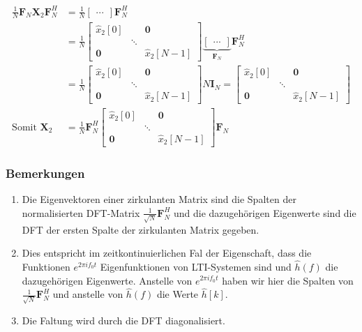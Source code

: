 \documentclass[11pt]{article}
\begin{document}
\begin{align*}
    \frac{1}{N}\mathbf{F}_N \mathbf{X}_2 \mathbf{F}_N^H &= \frac{1}{N} \begin{bmatrix}
        ...
    \end{bmatrix} \mathbf{F}_N^H \\
    &= \frac{1}{N} \begin{bmatrix}
        \hat{x}_2[0] & & \mathbf{0} \\
        & \ddots & \\
        \mathbf{0} & & \hat{x}_2[N-1]
    \end{bmatrix} \underbrace{\begin{bmatrix}
        ...
    \end{bmatrix}}_{\mathbf{F}_N} \mathbf{F}_N^H \\
    &= \frac{1}{N} \begin{bmatrix}
        \hat{x}_2[0] & & \mathbf{0} \\
        & \ddots & \\
        \mathbf{0} & & \hat{x}_2[N-1]
    \end{bmatrix} N \mathbf{I}_N = \begin{bmatrix}
        \hat{x}_2[0] & & \mathbf{0} \\
        & \ddots & \\
        \mathbf{0} & & \hat{x}_2[N-1]
    \end{bmatrix} \\
    \text{Somit } \mathbf{X}_2 &= \frac{1}{N} \mathbf{F}_N^H  \begin{bmatrix}
        \hat{x}_2[0] & & \mathbf{0} \\
        & \ddots & \\
        \mathbf{0} & & \hat{x}_2[N-1]
    \end{bmatrix}   \mathbf{F}_N
\end{align*}

\subsubsection*{Bemerkungen}

\begin{enumerate}
    \item Die Eigenvektoren einer zirkulanten Matrix sind die Spalten der normalisierten DFT-Matrix $\frac{1}{\sqrt{N}}\mathbf{F}_N^H$ und die dazugehörigen Eigenwerte sind die DFT der ersten Spalte der zirkulanten Matrix gegeben. 
    \item Dies entspricht im zeitkontinuierlichen Fal der Eigenschaft, dass die
    Funktionen $e^{2 \pi i f_0 t}$ Eigenfunktionen von LTI-Systemen sind und $\hat{h}(f)$ die dazugehörigen Eigenwerte. Anstelle von $e^{2 \pi i f_0 t}$ haben wir hier die Spalten von $\frac{1}{\sqrt{N}}\mathbf{F}_N^H$ und anstelle von $\hat{h}(f)$ die Werte $\hat{h}[k]$.
    \item Die Faltung wird durch die DFT diagonalisiert.
\end{enumerate}
\end{document}
